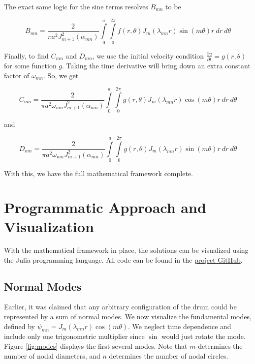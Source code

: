 \documentclass[11pt, letterpaper]{article}
\begin{document}
The exact same logic for the sine terms resolves $B_{mn}$ to be 

\begin{equation}
B_{mn} = \frac{2}{\pi a^{2} J_{m+1}^{2}(\alpha_{mn})} \int\limits_{0 }^{a} \int\limits_{0}^{2 \pi}{f(r, \theta) J_{m}(\lambda_{mn} r) \sin(m \theta)r ~dr ~d \theta}
\end{equation}

Finally, to find $C_{mn}$ and $D_{mn}$, we use the initial velocity condition $\frac{\partial u}{\partial t} = g(r, \theta)$ for some function $g$. Taking the time derivative will bring down an extra constant factor of $\omega_{mn}$. So, we get 

\begin{equation}
C_{mn} = \frac{2}{\pi a^{2} \omega_{mn} J_{m+1} ^{2}(\alpha_{mn})} \int\limits_{0}^{a} \int\limits_{0}^{2\pi} g(r, \theta) J_{m}(\lambda_{mn}r) \cos(m \theta) r ~dr ~d \theta
\end{equation}

and 

\begin{equation}
D_{mn} = \frac{2}{\pi a^{2} \omega_{mn} J_{m+1}^{2}(\alpha_{mn})} \int\limits_{0}^{a} \int\limits_{0}^{2 \pi}{g(r, \theta) J_{m}(\lambda_{mn} r) \sin(m \theta) r ~ dr ~d \theta}
\end{equation}

With this, we have the full mathematical framework complete.

\section{Programmatic Approach and Visualization}

With the mathematical framework in place, the solutions can be visualized using the Julia programming language.
All code can be found in the \href{https://github.com/TonehavenE/PHYS616_Final_project}{project GitHub}.

\subsection{Normal Modes}

Earlier, it was claimed that any arbitrary configuration of the drum could be represented by a sum of normal modes.
We now visualize the fundamental modes, defined by $\psi_{mn} = J_m(\lambda_{mn}r)\cos(m\theta)$. 
We neglect time dependence and include only one trigonometric multiplier since $\sin$ would just rotate the mode.
Figure \ref{fig:modes} displays the first several modes.
Note that $m$ determines the number of nodal diameters, and $n$ determines the number of nodal circles.
\end{document}
